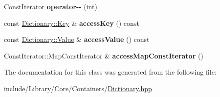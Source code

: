 \begin{DoxyCompactItemize}
\item 
\mbox{\label{classlibrary_1_1core_1_1ctnr_1_1_dictionary_1_1_const_iterator_a59a0f8c9fae35564269b2c40f15dd111}} 
\hyperlink{classlibrary_1_1core_1_1ctnr_1_1_dictionary_1_1_const_iterator}{Const\+Iterator} {\bfseries operator-\/-\/} (int)
\item 
\mbox{\label{classlibrary_1_1core_1_1ctnr_1_1_dictionary_1_1_const_iterator_a3abbbdba4e52151af85f982284e1983e}} 
const \hyperlink{classlibrary_1_1core_1_1types_1_1_string}{Dictionary\+::\+Key} \& {\bfseries access\+Key} () const
\item 
\mbox{\label{classlibrary_1_1core_1_1ctnr_1_1_dictionary_1_1_const_iterator_ab4534f572f1830ef275ec834652f33d7}} 
const \hyperlink{classlibrary_1_1core_1_1ctnr_1_1_object}{Dictionary\+::\+Value} \& {\bfseries access\+Value} () const
\item 
\mbox{\label{classlibrary_1_1core_1_1ctnr_1_1_dictionary_1_1_const_iterator_a0b07ce7ec7ba927b2a34ab1093f6c32c}} 
Const\+Iterator\+::\+Map\+Const\+Iterator \& {\bfseries access\+Map\+Const\+Iterator} ()
\end{DoxyCompactItemize}


The documentation for this class was generated from the following file\+:\begin{DoxyCompactItemize}
\item 
include/\+Library/\+Core/\+Containers/\hyperlink{_dictionary_8hpp}{Dictionary.\+hpp}\end{DoxyCompactItemize}
